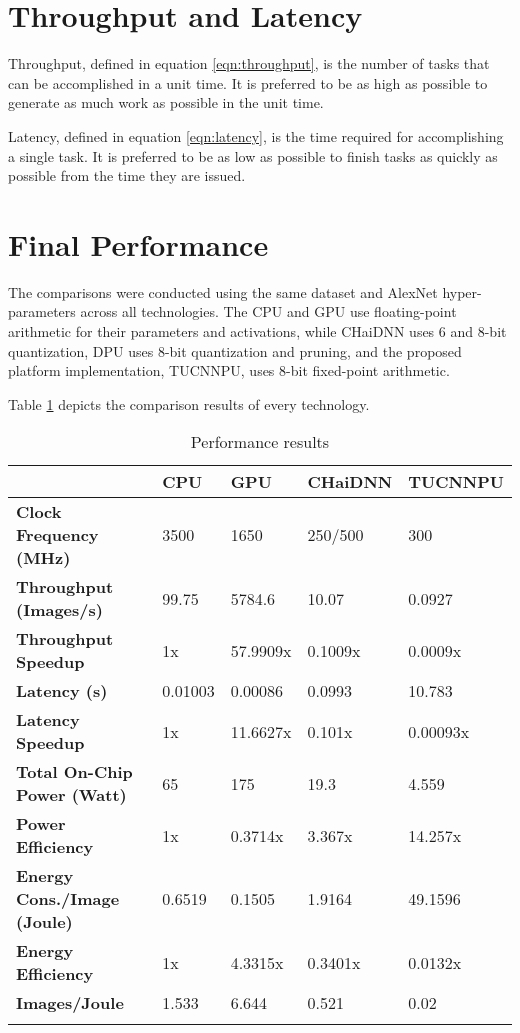 \section{Throughput and Latency}
Throughput, defined in equation \ref{eqn:throughput}, is the number of tasks that can be accomplished in a unit time. It is preferred to be as high as possible to generate as much work as possible in the unit time.

Latency, defined in equation \ref{eqn:latency}, is the time required for accomplishing a single task. It is preferred to be as low as possible to finish tasks as quickly as possible from the time they are issued.

\section{Final Performance}
The comparisons were conducted using the same dataset and AlexNet hyper-parameters across all technologies. The CPU and GPU use floating-point arithmetic for their parameters and activations, while CHaiDNN uses 6 and 8-bit quantization, DPU uses 8-bit quantization and pruning, and the proposed platform implementation, TUCNNPU, uses 8-bit fixed-point arithmetic.

Table \ref{tab:Performance-results} depicts the comparison results of every technology.

\begin{table}[H]
	\caption{Performance results}
	\label{tab:Performance-results}
	\centering
	\begin{tabular}{lllll}
		\toprule
		& \textbf{CPU} & \textbf{GPU} & \textbf{CHaiDNN} & \textbf{TUCNNPU}\\
		\midrule
			\textbf{Clock Frequency (MHz)} & 3500 & 1650 & 250/500 & 300\\
			\textbf{Throughput (Images/s)} & 99.75 & 5784.6 & 10.07 & 0.0927\\
			\textbf{Throughput Speedup} & 1x & 57.9909x & 0.1009x & 0.0009x\\
			\textbf{Latency (s)} & 0.01003 & 0.00086 & 0.0993 & 10.783\\
			\textbf{Latency Speedup} & 1x & 11.6627x & 0.101x & 0.00093x\\
			\textbf{Total On-Chip Power (Watt)} & 65 & 175 & 19.3 & 4.559\\
			\textbf{Power Efficiency} & 1x & 0.3714x & 3.367x & 14.257x\\
			\textbf{Energy Cons./Image (Joule)} & 0.6519 & 0.1505 & 1.9164 & 49.1596\\
			\textbf{Energy Efficiency} & 1x & 4.3315x & 0.3401x & 0.0132x\\
			\textbf{Images/Joule} & 1.533 & 6.644 & 0.521 & 0.02\\
		\bottomrule\\
	\end{tabular}
\end{table}

